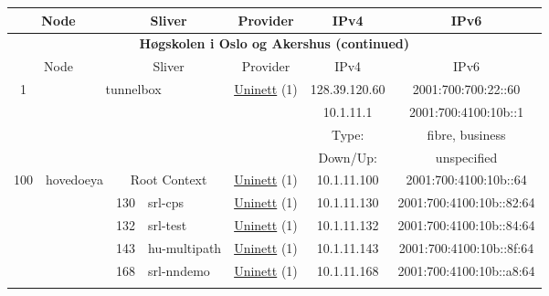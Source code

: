 \begin{small}
\begin{center}
\begin{longtable}{|c|c|c|c|c|c|c|c|}
 \multicolumn{2}{|p{8em}|}{Node} & \multicolumn{2}{|p{8em}|}{Sliver} & \multicolumn{2}{|p{8em}|}{Provider} & IPv4 & IPv6 \\ \hline
\endfirsthead
\hline
 \multicolumn{8}{|c|}{\textbf{Høgskolen i Oslo og Akershus (continued)}} \\ \hline
 \multicolumn{2}{|p{8em}|}{Node} & \multicolumn{2}{|p{8em}|}{Sliver} & \multicolumn{2}{|p{8em}|}{Provider} & IPv4 & IPv6 \\ \hline
\endhead
 \multirow{4}{*}{\tiny{1}} & \multicolumn{3}{|c|}{\multirow{4}{*}{\tiny{tunnelbox}}} & \multicolumn{2}{|c|}{\multirow{4}{*}{\tiny{\href{https://www.uninett.no}{Uninett} (1)}}} & \tiny{128.39.120.60} & \tiny{2001:700:700:22::60} \\* \cline{7-7}\cline{8-8}
  & \multicolumn{3}{|c|}{} & \multicolumn{2}{|c|}{} & \tiny{10.1.11.1} & \tiny{2001:700:4100:10b::1} \\* \cline{7-7}\cline{8-8}
  & \multicolumn{3}{|c|}{} & \multicolumn{2}{|c|}{} & Type: & fibre, business \\* \cline{7-7}\cline{8-8}
  & \multicolumn{3}{|c|}{} & \multicolumn{2}{|c|}{} & Down/Up:  & unspecified \\ \hline
 \multirow{7}{*}{\tiny{100}} & \multicolumn{1}{|l|}{\multirow{7}{*}{\tiny{hovedoeya}}} & \multicolumn{2}{|c|}{\tiny{Root Context}} & \multicolumn{2}{|c|}{\tiny{\href{https://www.uninett.no}{Uninett} (1)}} & \tiny{10.1.11.100} & \tiny{2001:700:4100:10b::64} \\* \cline{3-3}\cline{4-4}\cline{5-5}\cline{6-6}\cline{7-7}\cline{8-8}
  &  & \tiny{130} & \multicolumn{1}{|l|}{\tiny{srl-cps}} & \multicolumn{2}{|c|}{\tiny{\href{https://www.uninett.no}{Uninett} (1)}} & \tiny{10.1.11.130} & \tiny{2001:700:4100:10b::82:64} \\* \cline{3-3}\cline{4-4}\cline{5-5}\cline{6-6}\cline{7-7}\cline{8-8}
  &  & \tiny{132} & \multicolumn{1}{|l|}{\tiny{srl-test}} & \multicolumn{2}{|c|}{\tiny{\href{https://www.uninett.no}{Uninett} (1)}} & \tiny{10.1.11.132} & \tiny{2001:700:4100:10b::84:64} \\* \cline{3-3}\cline{4-4}\cline{5-5}\cline{6-6}\cline{7-7}\cline{8-8}
  &  & \tiny{143} & \multicolumn{1}{|l|}{\tiny{hu-multipath}} & \multicolumn{2}{|c|}{\tiny{\href{https://www.uninett.no}{Uninett} (1)}} & \tiny{10.1.11.143} & \tiny{2001:700:4100:10b::8f:64} \\* \cline{3-3}\cline{4-4}\cline{5-5}\cline{6-6}\cline{7-7}\cline{8-8}
  &  & \tiny{168} & \multicolumn{1}{|l|}{\tiny{srl-nndemo}} & \multicolumn{2}{|c|}{\tiny{\href{https://www.uninett.no}{Uninett} (1)}} & \tiny{10.1.11.168} & \tiny{2001:700:4100:10b::a8:64} \\* \cline{3-3}\cline{4-4}\cline{5-5}\cline{6-6}\cline{7-7}\cline{8-8}

\end{longtable}
\end{center}
\end{small}
